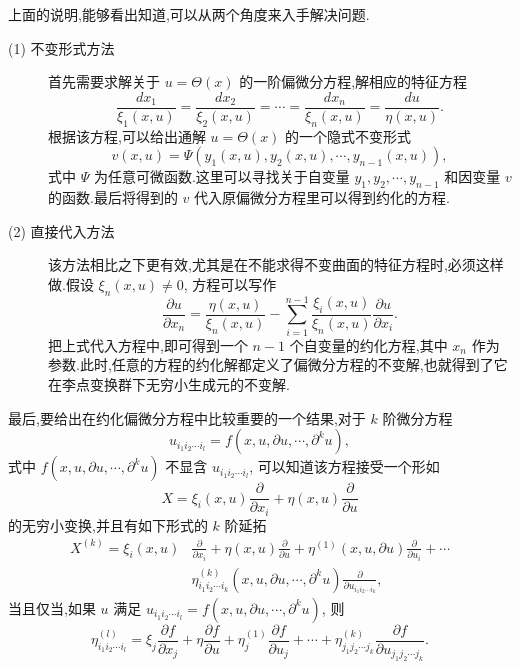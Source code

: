 上面的说明,能够看出知道,可以从两个角度来入手解决问题.
\begin{description}
	\item[(1) 不变形式方法] 首先需要求解关于 $u=\Theta(x)$ 的一阶偏微分方程,解相应的特征方程
	\begin{equation*}
		\frac{dx_1}{\xi_1(x,u)}=\frac{dx_2}{\xi_2(x,u)}=\cdots=\frac{dx_n}{\xi_n(x,u)}=\frac{du}{\eta(x,u)}.
\end{equation*}
根据该方程,可以给出通解 $u=\Theta(x)$ 的一个隐式不变形式
\begin{equation*}
	v(x,u)=\Psi(y_1(x,u),y_2(x,u),\cdots,y_{n-1}(x,u)),
\end{equation*}
式中 $\Psi$ 为任意可微函数.这里可以寻找关于自变量 $y_1,y_2,\cdots,y_{n-1}$ 和因变量 $v$ 的函数.最后将得到的 $v$ 代入原偏微分方程里可以得到约化的方程.
	\item[(2) 直接代入方法] 该方法相比之下更有效,尤其是在不能求得不变曲面的特征方程时,必须这样做.假设 $\xi_n(x,u)\neq 0$, 方程可以写作
	\begin{equation*}
		\frac{\partial u}{\partial x_n}=\frac{\eta(x,u)}{\xi_n(x,u)}-\sum_{i=1}^{n-1}\frac{\xi_i(x,u)}{\xi_n(x,u)}\frac{\partial u}{\partial x_i}.
	\end{equation*}
	把上式代入方程中,即可得到一个 $n-1$ 个自变量的约化方程,其中 $x_n$ 作为参数.此时,任意的方程的约化解都定义了偏微分方程的不变解,也就得到了它在李点变换群下无穷小生成元的不变解.
\end{description}

最后,要给出在约化偏微分方程中比较重要的一个结果,对于 $k$ 阶微分方程
\begin{equation*}
	u_{i_1i_2\cdots i_l}=f(x,u,\partial u,\cdots,\partial ^k u),
\end{equation*}
式中 $f(x,u,\partial u,\cdots,\partial ^k u)$ 不显含 $u_{i_1i_2\cdots i_l}$, 可以知道该方程接受一个形如
\begin{equation*}
	X=\xi_i(x,u)\frac{\partial}{\partial x_i}+\eta(x,u)\frac{\partial}{\partial u}
\end{equation*}
的无穷小变换,并且有如下形式的 $k$ 阶延拓
\begin{equation*}
\begin{aligned}
X^{(k)}=\xi_i(x,u)&\frac{\partial}{\partial x_i}+\eta(x,u)\frac{\partial}{\partial u}+\eta^{(1)}(x,u,\partial u)\frac{\partial}{\partial u_i}+\cdots \\
&\eta^{(k)}_{i_1i_2\cdots i_k}(x,u,\partial u,\cdots,\partial ^k u)\frac{\partial}{\partial u_{i_1i_2\cdots i_k}},
\end{aligned}
\end{equation*}
当且仅当,如果 $u$ 满足 $u_{i_1i_2\cdots i_l}=f(x,u,\partial u,\cdots,\partial ^k u)$, 则
\begin{equation*}
	\eta_{i_1i_2\cdots i_l}^{(l)}=\xi_j\frac{\partial f}{\partial x_j}+\eta\frac{\partial f}{\partial u}+\eta_j^{(1)}\frac{\partial f}{\partial u_j}+\cdots+\eta_{j_1j_2\cdots j_k}^{(k)}\frac{\partial f}{\partial u_{j_1j_2\cdots j_k}}.
\end{equation*}

